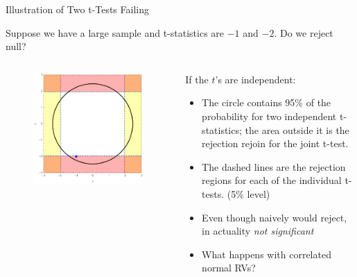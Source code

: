 \begin{frame}{Illustration of Two t-Tests Failing}

Suppose we have a large sample and t-statistics are $-1$ and $-2$. Do we reject null?


\begin{columns}
\begin{column}{0.5\textwidth}
\begin{figure}	
	\includegraphics[width=.8\textwidth]{jointTtests1.pdf}	
\end{figure}
\end{column}
\begin{column}{0.5\textwidth}
\small{
If the $t$'s are independent:
\begin{itemize}
	\item The circle contains 95\% of the probability for two independent t-statistics;
	the area outside it is the rejection rejoin for the joint t-test.
	\item The dashed lines are the rejection regions for each of the individual t-tests.  (5\% level)
	\item Even though naively would reject, in actuality \emph{not significant}
	\item What happens with correlated normal RVs?
\end{itemize}
}
\end{column}

\end{columns}

\end{frame}

